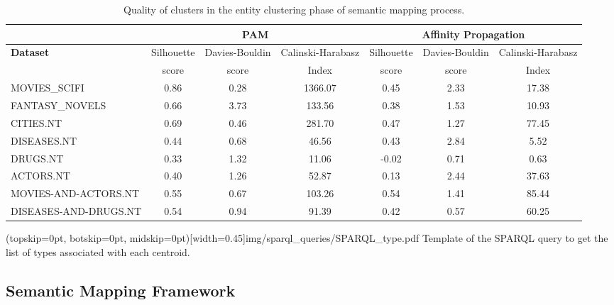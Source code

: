 \documentclass{ieeeaccess}
\begin{document}
\begin{table}[!h]
\caption{Quality of clusters in the entity
clustering phase of semantic mapping process.}
\label{tab:semantic_map_quality}
\centering
\begin{tabular}{lcccccc}
\toprule
& \multicolumn{3}{c}{PAM} 
& \multicolumn{3}{c}{Affinity Propagation} \\
\hline
\textbf{Dataset} & 
\footnotesize
Silhouette & 
\footnotesize
Davies-Bouldin & 
\footnotesize
Calinski-Harabasz &
\footnotesize
Silhouette & 
\footnotesize
Davies-Bouldin & 
\footnotesize
Calinski-Harabasz \\
& 
\footnotesize
score 
&
\footnotesize
score &
\footnotesize
Index &
\footnotesize
score &
\footnotesize
score &
\footnotesize
Index \\
\hline

MOVIES\_SCIFI & 0.86 & 0.28 & 1366.07 & 0.45 & 2.33 & 17.38 \\
FANTASY\_NOVELS  & 0.66 & 3.73 & 133.56 & 0.38 & 1.53 & 10.93 \\
CITIES.NT & 0.69 & 0.46 & 281.70 & 0.47 & 1.27 & 77.45 \\
DISEASES.NT & 0.44 & 0.68 & 46.56 & 0.43 & 2.84 & 5.52 \\
DRUGS.NT & 0.33 & 1.32 & 11.06 & -0.02 & 0.71 & 0.63 \\
ACTORS.NT & 0.40 & 1.26 & 52.87 & 0.13 & 2.44 & 37.63 \\
MOVIES-AND-ACTORS.NT & 0.55 & 0.67 & 103.26 & 0.54 & 1.41 & 85.44 \\
DISEASES-AND-DRUGS.NT & 0.54 & 0.94 & 91.39 & 0.42 & 0.57 & 60.25 \\

\bottomrule
\end{tabular}
\label{tab1}
\end{table}

\Figure[h!](topskip=0pt, botskip=0pt, midskip=0pt)[width=0.45\textwidth]{img/sparql_queries/SPARQL_type.pdf}
{Template of the SPARQL query to get the list of types
associated with each centroid.
\label{fig:sparql_query_type}}

\subsection{Semantic Mapping Framework}
\end{document}

